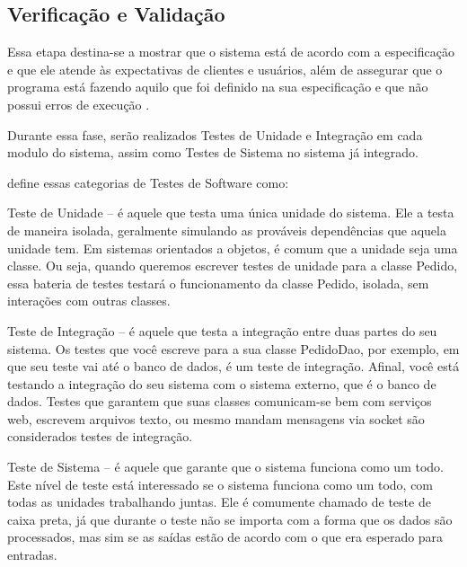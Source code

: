 \subsection{Verificação e Validação}
Essa etapa destina-se a mostrar que o sistema está de acordo com a especificação 
e que ele atende às expectativas de clientes e usuários,  al\'em de assegurar 
que o  programa está fazendo aquilo que foi definido na sua especificação e que não 
possui  erros  de  execução \cite{aguiar2012requisitos}. 

Durante essa fase, ser\~ao realizados Testes de Unidade e Integra\c{c}\~ao em 
cada modulo do sistema, assim como Testes de Sistema no sistema j\'a integrado.

 define essas categorias de Testes de Software como:

\begin{alineascomponto}
	\item Teste de Unidade -- é aquele que testa uma única unidade do sistema. 
Ele a testa de maneira isolada, geralmente simulando as prováveis dependências 
que aquela unidade tem. Em sistemas orientados a objetos, é comum que a unidade 
seja uma classe. Ou seja, quando queremos escrever testes de unidade para a 
classe Pedido, essa bateria de testes testará o funcionamento da classe Pedido, 
isolada, sem interações com outras classes.

	\item  Teste de Integração -- é aquele que testa a integração entre duas 
partes do seu sistema. Os testes que você escreve para a sua classe PedidoDao, 
por exemplo, em que seu teste vai até o banco de dados, é um teste de integração. 
Afinal, você está testando a integração do seu sistema com o sistema externo, 
que é o banco de dados. Testes que garantem que suas classes comunicam-se bem 
com serviços web, escrevem arquivos texto, ou mesmo mandam mensagens via socket 
são considerados testes de integração.

	\item Teste de Sistema -- \'e aquele que garante que o sistema funciona como um todo. Este 
nível de teste está interessado se o sistema funciona como um todo, com todas as 
unidades trabalhando juntas. Ele é comumente chamado de teste de caixa preta, já 
que durante o teste n\~ao se importa com a forma que os dados s\~ao processados, mas sim se as sa\'idas est\~ao de acordo com o que era esperado para entradas. 
\end{alineascomponto}

